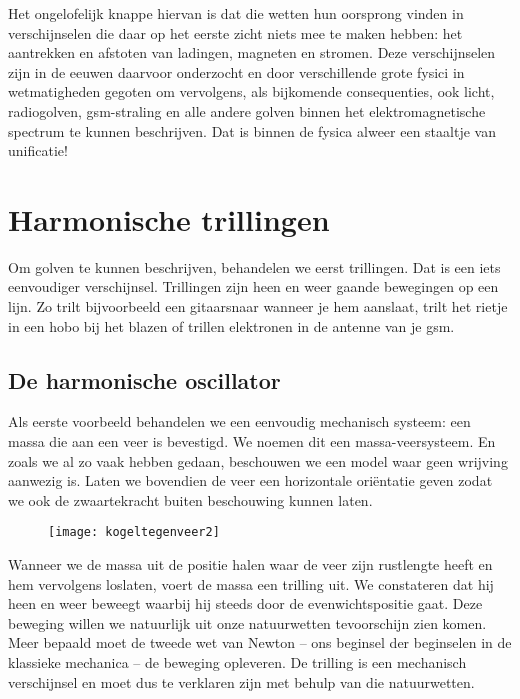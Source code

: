 Het ongelofelijk knappe hiervan is dat die wetten hun oorsprong vinden in verschijnselen die daar op het eerste zicht niets mee te maken hebben: het aantrekken en afstoten van ladingen, magneten en stromen. Deze verschijnselen zijn in de eeuwen daarvoor onderzocht en door verschillende grote fysici in wetmatigheden gegoten om vervolgens, als bijkomende consequenties, ook licht, radiogolven, gsm-straling en alle andere golven binnen het elektromagnetische spectrum te kunnen beschrijven. Dat is binnen de fysica alweer een staaltje van unificatie!

\newpage

\chapter{Harmonische trillingen}

Om golven te kunnen beschrijven, behandelen we eerst trillingen. Dat is een iets eenvoudiger verschijnsel. Trillingen zijn heen en weer gaande bewegingen op een lijn. Zo trilt bijvoorbeeld een gitaarsnaar wanneer je hem aanslaat, trilt het rietje in een hobo bij het blazen of trillen elektronen in de antenne van je gsm.


% 

\section{De harmonische oscillator}

Als eerste voorbeeld behandelen we een eenvoudig mechanisch systeem: een massa die aan een veer is bevestigd. We noemen dit een massa-veersysteem. En zoals we al zo vaak hebben gedaan, beschouwen we een model waar geen wrijving aanwezig is. Laten we bovendien de veer een horizontale ori\"entatie geven zodat we ook de zwaartekracht buiten beschouwing kunnen laten.
\begin{figure}[h]
\centering
\texttt{[image: kogeltegenveer2]}
\end{figure}
Wanneer we de massa uit de positie halen waar de veer zijn rustlengte heeft en hem vervolgens loslaten, voert de massa een trilling uit. We constateren dat hij heen en weer beweegt waarbij hij steeds door de evenwichtspositie gaat. Deze beweging willen we natuurlijk uit onze natuurwetten tevoorschijn zien komen. Meer bepaald moet de tweede wet van Newton -- ons beginsel der beginselen in de klassieke mechanica -- de beweging opleveren. De trilling is een mechanisch verschijnsel en moet dus te verklaren zijn met behulp van die natuurwetten. 

